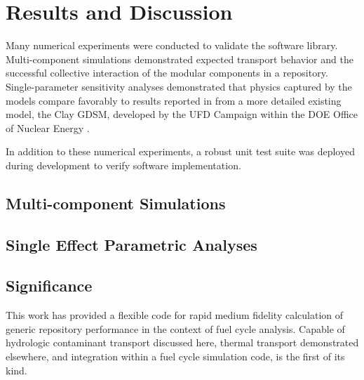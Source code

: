 \section{Results and Discussion}
\label{sec:results}

Many numerical experiments were conducted to validate the \Cyder software library.
Multi-component simulations demonstrated expected transport behavior and
the successful collective interaction of the modular
components in a \Cyder repository. Single-parameter sensitivity analyses
demonstrated that physics captured by the \Cyder models compare favorably to
results reported in \cite{huff_key_2012} from a more detailed existing model,
the Clay \gls{GDSM}, developed by the \gls{UFD} Campaign within the
\gls{DOE} Office of Nuclear Energy \cite{clayton_generic_2011}.

In addition to these numerical experiments, a robust unit test suite was
deployed during development to verify \Cyder software implementation.

\subsection{Multi-component Simulations}




\subsection{Single Effect Parametric Analyses}


\subsection{Significance}

This work has provided a flexible code for rapid medium fidelity calculation
of generic repository performance in the context of fuel cycle analysis.
Capable of hydrologic contaminant transport discussed here, thermal transport
demonstrated elsewhere, and integration within a fuel cycle simulation code,
\Cyder is the first of its kind.

